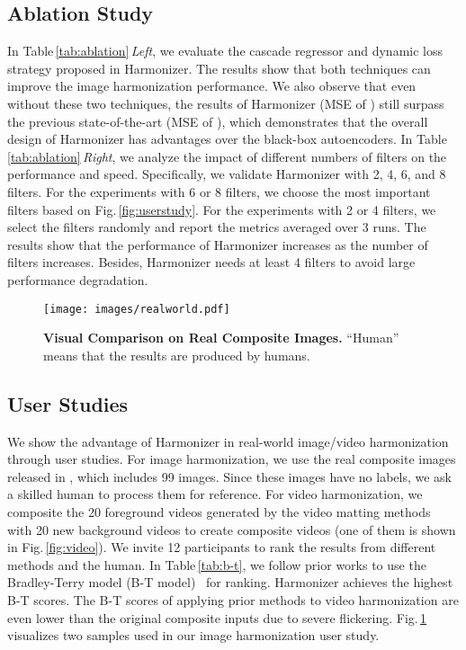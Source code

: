 \documentclass[runningheads]{llncs}
\newcommand{\ke}[1]{{\color{black}#1}}
\begin{document}
\subsection{Ablation Study}\label{sec:4_3}
In Table\,\ref{tab:ablation}\,\textit{Left}, we evaluate the cascade regressor and dynamic loss strategy proposed in Harmonizer. The results show that both techniques can improve the image harmonization performance. We also observe that even without these two techniques, the results of Harmonizer (MSE of ) still surpass the previous state-of-the-art (MSE of ), which demonstrates that the overall design of Harmonizer has advantages over the black-box autoencoders. 
In Table\,\ref{tab:ablation}\,\textit{Right}, we analyze the impact of different numbers of filters on the performance and speed. 
Specifically, we validate Harmonizer with 2, 4, 6, and 8 filters. 
For the experiments with 6 or 8 filters, we choose the most important filters based on Fig.\,\ref{fig:userstudy}. For the experiments with 2 or 4 filters, we select the filters randomly and report the metrics averaged over 3 runs. The results show that the performance of Harmonizer increases as the number of filters increases. Besides, Harmonizer needs at least 4 filters to avoid large performance degradation.




 \begin{figure}[t]
\centering
\texttt{[image: images/realworld.pdf]}
{\begin{center}
\vspace{-0.5cm}
\caption{\textbf{Visual Comparison on Real Composite Images.} ``Human'' means that the results are produced by humans.}
\label{fig:realworld}
\end{center}
}
\vspace{-0.4cm}
\end{figure}




\subsection{User Studies}\label{sec:4_4}


We show the advantage of Harmonizer in real-world image/video harmonization through user studies. For image harmonization, we use the real composite images released in \cite{DIH}, which includes 99 images. Since these images have no labels, we ask a skilled human to process them for reference. For video harmonization, we composite the 20 foreground videos generated by the video matting methods~\cite{Qin_2020_PR,MODNet,lin2021robust} with 20 new background videos to create \ke{composite} videos (one of them is shown in Fig.\,\ref{fig:video}). 
We invite 12 participants to rank the results from different methods and the human. In Table\,\ref{tab:b-t}, we follow prior works to use the Bradley-Terry model (B-T model)~\cite{btmodel} for ranking.
Harmonizer achieves the highest B-T scores. The B-T scores of applying prior methods to video harmonization are even lower than the original composite inputs due to severe flickering.
Fig.\,\ref{fig:realworld} visualizes two samples used in our image harmonization user study.
\end{document}
